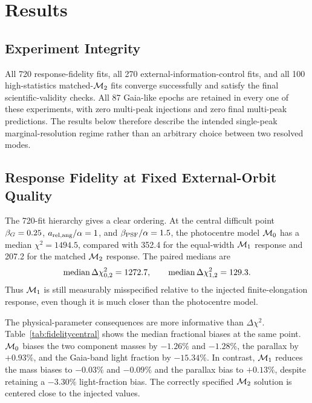 \section{Results}
\label{sect:results}

\subsection{Experiment Integrity}

All 720 response-fidelity fits, all 270 external-information-control fits, and all 100 high-statistics matched-$\mathcal{M}_2$ fits converge successfully and satisfy the final scientific-validity checks. All 87 Gaia-like epochs are retained in every one of these experiments, with zero multi-peak injections and zero final multi-peak predictions. The results below therefore describe the intended single-peak marginal-resolution regime rather than an arbitrary choice between two resolved modes.

\subsection{Response Fidelity at Fixed External-Orbit Quality}

The 720-fit hierarchy gives a clear ordering. At the central difficult point $\beta_G=0.25$, $a_{\rm rel,ang}/\alpha=1$, and $\beta_{\rm PSF}/\alpha=1.5$, the photocentre model $\mathcal{M}_0$ has a median $\chi^2=1494.5$, compared with 352.4 for the equal-width $\mathcal{M}_1$ response and 207.2 for the matched $\mathcal{M}_2$ response. The paired medians are
\begin{equation}
{\rm median}\,\Delta\chi^2_{0,2}=1272.7,\qquad
{\rm median}\,\Delta\chi^2_{1,2}=129.3.
\end{equation}
Thus $\mathcal{M}_1$ is still measurably misspecified relative to the injected finite-elongation response, even though it is much closer than the photocentre model.

The physical-parameter consequences are more informative than $\Delta\chi^2$. Table~\ref{tab:fidelitycentral} shows the median fractional biases at the same point. $\mathcal{M}_0$ biases the two component masses by $-1.26\%$ and $-1.28\%$, the parallax by $+0.93\%$, and the Gaia-band light fraction by $-15.34\%$. In contrast, $\mathcal{M}_1$ reduces the mass biases to $-0.03\%$ and $-0.09\%$ and the parallax bias to $+0.13\%$, despite retaining a $-3.30\%$ light-fraction bias. The correctly specified $\mathcal{M}_2$ solution is centered close to the injected values.

